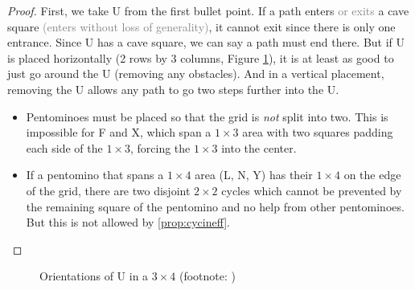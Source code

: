 \documentclass{article}
\theoremstyle{definition}%
\newcommand{\minordetail}[1]{\textcolor{gray}{#1}}
\begin{document}
\begin{proof}
First, we take U from the first bullet point. If a path enters \minordetail{or exits} a cave square \minordetail{(enters without loss of generality)}, it cannot exit since there is only one entrance. Since U has a cave square, we can say a path must end there. But if U is placed horizontally (2 rows by 3 columns, Figure \ref{fig:u3x4}), it is at least as good to just go around the U (removing any obstacles). And in a vertical placement, removing the U allows any path to go two steps further into the U.
\begin{itemize}
    \item Pentominoes must be placed so that the grid is \emph{not} split into two. This is impossible for F and X, which span a $1 \times 3$ area with two squares padding each side of the $1 \times 3$, forcing the $1 \times 3$ into the center.
    \item If a pentomino that spans a $1 \times 4$ area (L, N, Y) has their $1 \times 4$ on the edge of the grid, there are two disjoint $2 \times 2$ cycles which cannot be prevented by the remaining square of the pentomino and no help from other pentominoes. But this is not allowed by \ref{prop:cycineff}. \qedhere
\end{itemize}
\end{proof}

\begin{figure}
    \centering
    \caption{Orientations of U in a $3 \times 4$ (footnote: \protect\footnotemark)}
    \label{fig:u3x4}
\end{figure}
\end{document}
